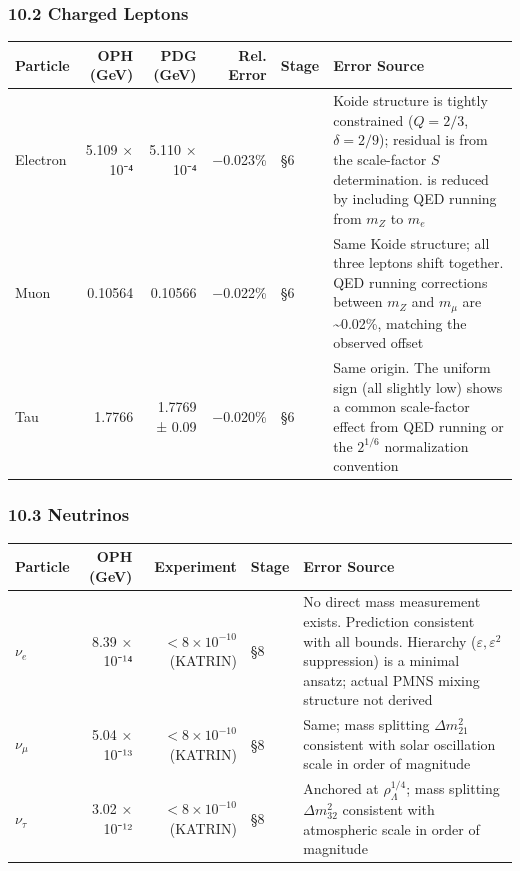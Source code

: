 \subsubsection{10.2 Charged Leptons}\label{102-charged-leptons}

{\def\LTcaptype{none} %
\begin{longtable}[]{@{}lrrrll@{}}
\toprule\noalign{}
Particle & OPH (GeV) & PDG (GeV) & Rel. Error & Stage & Error Source \\
\midrule\noalign{}
\endhead
\bottomrule\noalign{}
\endlastfoot
Electron & 5.109 × 10⁻⁴ & 5.110 × 10⁻⁴ & −0.023\% & §6 & Koide structure is tightly constrained (\(Q=2/3\), \(\delta=2/9\)); residual is from the scale-factor \(S\) determination. is reduced by including QED running from \(m_Z\) to \(m_e\) \\
Muon & 0.10564 & 0.10566 & −0.022\% & §6 & Same Koide structure; all three leptons shift together. QED running corrections between \(m_Z\) and \(m_\mu\) are \textasciitilde0.02\%, matching the observed offset \\
Tau & 1.7766 & 1.7769 ± 0.09 & −0.020\% & §6 & Same origin. The uniform sign (all slightly low) shows a common scale-factor effect from QED running or the \(2^{1/6}\) normalization convention \\
\end{longtable}
}

\subsubsection{10.3 Neutrinos}\label{103-neutrinos}

{\def\LTcaptype{none} %
\begin{longtable}[]{@{}lrrll@{}}
\toprule\noalign{}
Particle & OPH (GeV) & Experiment & Stage & Error Source \\
\midrule\noalign{}
\endhead
\bottomrule\noalign{}
\endlastfoot
\(\nu_e\) & 8.39 × 10⁻¹⁴ & \(< 8 \times 10^{-10}\) (KATRIN) & §8 & No direct mass measurement exists. Prediction consistent with all bounds. Hierarchy (\(\varepsilon, \varepsilon^2\) suppression) is a minimal ansatz; actual PMNS mixing structure not derived \\
\(\nu_\mu\) & 5.04 × 10⁻¹³ & \(< 8 \times 10^{-10}\) (KATRIN) & §8 & Same; mass splitting \(\Delta m_{21}^2\) consistent with solar oscillation scale in order of magnitude \\
\(\nu_\tau\) & 3.02 × 10⁻¹² & \(< 8 \times 10^{-10}\) (KATRIN) & §8 & Anchored at \(\rho_\Lambda^{1/4}\); mass splitting \(\Delta m_{32}^2\) consistent with atmospheric scale in order of magnitude \\
\end{longtable}
}

